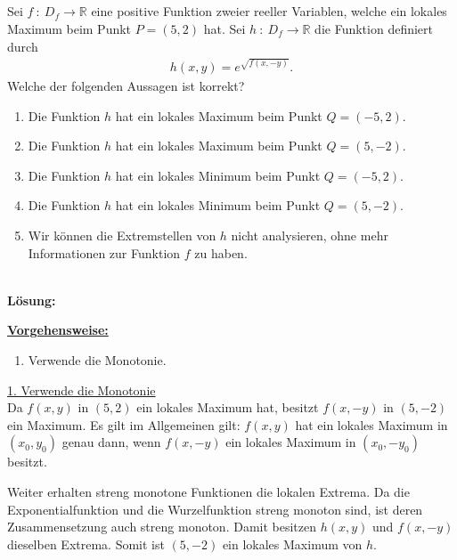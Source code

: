 \subsection*{}
Sei $ f \ : \ D_f \to \mathbb{R} $ eine positive Funktion zweier reeller Variablen, welche ein lokales Maximum beim Punkt $ P = (5,2)  $ hat.
Sei $ h  \ : \ D_f \to \mathbb{R} $ die Funktion definiert durch
\begin{align*}
	h(x,y) = e^{\sqrt{f(x,-y)}}.
\end{align*} 
Welche der folgenden Aussagen ist korrekt?
\renewcommand{\labelenumi}{(\alph{enumi})}
\begin{enumerate}
	\item Die Funktion $ h $ hat ein lokales Maximum beim Punkt $ Q = (-5,2). $
	\item Die Funktion $ h $ hat ein lokales Maximum beim Punkt $ Q = (5,-2). $
	\item Die Funktion $ h $ hat ein lokales Minimum beim Punkt $ Q = (-5,2). $
	\item Die Funktion $ h $ hat ein lokales Minimum beim Punkt $ Q = (5,-2). $
	\item Wir können die Extremstellen von $ h $ nicht analysieren, ohne mehr Informationen zur Funktion $ f $ zu haben.
\end{enumerate}
\ \\
\textbf{Lösung:}
\begin{mdframed}
	\underline{\textbf{Vorgehensweise:}}
	\renewcommand{\labelenumi}{\theenumi.}
	\begin{enumerate}
		\item Verwende die Monotonie.
	\end{enumerate}
\end{mdframed}
\underline{1. Verwende die Monotonie}\\
Da $ f(x,y) $ in  $ (5,2) $ ein lokales Maximum hat, besitzt $ f(x,-y) $ in $ (5,-2) $ ein Maximum. 
Es gilt im Allgemeinen gilt: $ f(x,y) $ hat ein lokales Maximum in $ (x_0,y_0) $ genau dann, wenn $ f(x,-y) $ ein lokales Maximum in $ (x_0,-y_0) $ besitzt.

Weiter erhalten streng monotone Funktionen die lokalen Extrema.
Da die Exponentialfunktion und die Wurzelfunktion streng monoton sind, ist deren Zusammensetzung auch streng monoton. Damit besitzen $ h(x,y) $ und $ f(x,-y) $ dieselben Extrema. Somit ist $ (5,-2) $ ein lokales Maximum von $ h$. 


\newpage
